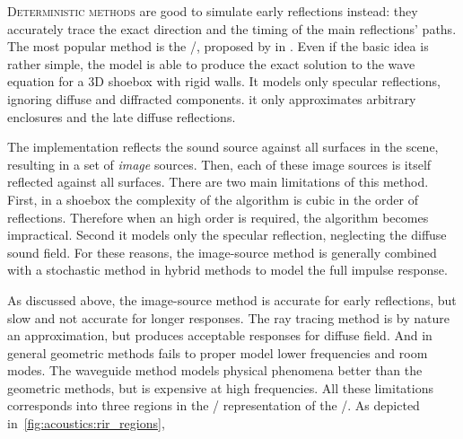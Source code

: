 \mynewline
\textsc{Deterministic methods} are good to simulate early reflections instead:
they accurately trace the exact direction and the timing of the main reflections' paths.
The most popular method is the \ISMdef/, proposed by \citeauthor{allen1979image} in .
Even if the basic idea is rather simple, the model is able to produce the exact solution to the wave equation for a 3D shoebox with rigid walls.
It models only specular reflections, ignoring diffuse and diffracted components.
it only approximates arbitrary enclosures and the late diffuse reflections.

The implementation reflects the sound source against all surfaces in the scene, resulting in a set of \textit{image} sources.
Then, each of these image sources is itself reflected against all surfaces.
There are two main limitations of this method.
First, in a shoebox the complexity of the algorithm is cubic in the order of reflections. Therefore when an high order is required, the algorithm becomes impractical.
Second it models only the specular reflection, neglecting the diffuse sound field.
For these reasons, the image-source method is generally combined with a stochastic method in hybrid methods to model the full impulse response.

As discussed above, the image-source method is accurate for early reflections, but slow and not accurate for longer responses.
The ray tracing method is by nature an approximation, but produces acceptable responses for diffuse field.
And in general geometric methods fails to proper model lower frequencies and room modes.
The waveguide method models physical phenomena better than the geometric methods, but is expensive at high frequencies.
All these limitations corresponds into three regions in the \TFdef/ representation of the \RIR/.
As depicted in~\cref{fig:acoustics:rir_regions},

